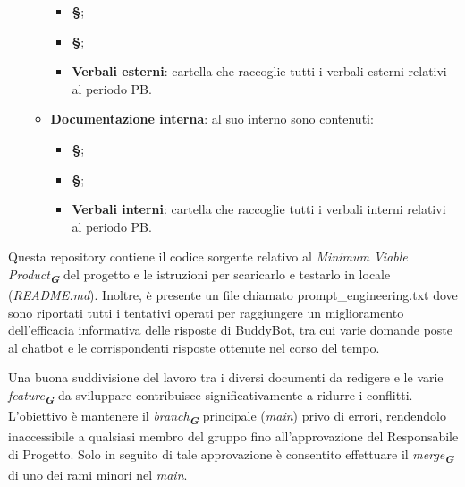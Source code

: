 \begin{itemize}
\begin{itemize}
\begin{itemize}
            \item \textbf{\S{}};
            \item \textbf{\S{}};
            \item \textbf{Verbali esterni}: cartella che raccoglie tutti i verbali esterni relativi al periodo PB.
        \end{itemize}
        \item \textbf{Documentazione interna}: al suo interno sono contenuti:
        \begin{itemize}
            \item \textbf{\S{}};
            \item \textbf{\S{}};
            \item \textbf{Verbali interni}: cartella che raccoglie tutti i verbali interni relativi al periodo PB.
        \end{itemize}
    \end{itemize}
\end{itemize}

\label{sec:repo_buddybot}
Questa repository contiene il codice sorgente relativo al \emph{Minimum Viable Product}\textsubscript{\textit{\textbf{G}}} del progetto e le
istruzioni per scaricarlo e testarlo in locale (\emph{README.md}).
Inoltre, è presente un file chiamato prompt\_engineering.txt dove sono riportati tutti i tentativi operati 
per raggiungere un miglioramento dell'efficacia informativa delle risposte di BuddyBot, 
tra cui varie domande poste al chatbot e le corrispondenti risposte ottenute nel corso del tempo.

Una buona suddivisione del lavoro tra i diversi documenti da redigere e le varie \emph{feature}\textsubscript{\textit{\textbf{G}}}
da sviluppare contribuisce significativamente a ridurre i conflitti. L’obiettivo è mantenere 
il \emph{branch}\textsubscript{\textit{\textbf{G}}} principale (\emph{main}) privo di errori, rendendolo inaccessibile a qualsiasi membro 
del gruppo fino all’approvazione del Responsabile di Progetto. Solo in seguito di tale
approvazione è consentito effettuare il \emph{merge}\textsubscript{\textit{\textbf{G}}} di uno dei rami minori nel \emph{main}.


